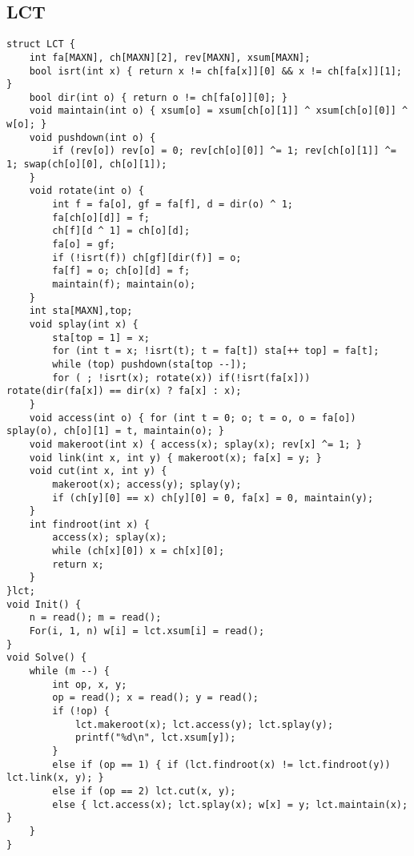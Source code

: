 \documentclass[twocolumn,a4]{article}
\begin{document}
\subsection{LCT}
\begin{lstlisting}
struct LCT {
    int fa[MAXN], ch[MAXN][2], rev[MAXN], xsum[MAXN];
    bool isrt(int x) { return x != ch[fa[x]][0] && x != ch[fa[x]][1]; }
    bool dir(int o) { return o != ch[fa[o]][0]; }
    void maintain(int o) { xsum[o] = xsum[ch[o][1]] ^ xsum[ch[o][0]] ^ w[o]; }
    void pushdown(int o) {
        if (rev[o]) rev[o] = 0; rev[ch[o][0]] ^= 1; rev[ch[o][1]] ^= 1; swap(ch[o][0], ch[o][1]);
    }
    void rotate(int o) {
        int f = fa[o], gf = fa[f], d = dir(o) ^ 1;
        fa[ch[o][d]] = f;
        ch[f][d ^ 1] = ch[o][d];
        fa[o] = gf;
        if (!isrt(f)) ch[gf][dir(f)] = o;
        fa[f] = o; ch[o][d] = f;
        maintain(f); maintain(o);
    }
    int sta[MAXN],top;
    void splay(int x) {
        sta[top = 1] = x;
        for (int t = x; !isrt(t); t = fa[t]) sta[++ top] = fa[t];
        while (top) pushdown(sta[top --]);
        for ( ; !isrt(x); rotate(x)) if(!isrt(fa[x])) rotate(dir(fa[x]) == dir(x) ? fa[x] : x);
    }
    void access(int o) { for (int t = 0; o; t = o, o = fa[o]) splay(o), ch[o][1] = t, maintain(o); }
    void makeroot(int x) { access(x); splay(x); rev[x] ^= 1; }
    void link(int x, int y) { makeroot(x); fa[x] = y; }
    void cut(int x, int y) {
        makeroot(x); access(y); splay(y);
        if (ch[y][0] == x) ch[y][0] = 0, fa[x] = 0, maintain(y);
    }
    int findroot(int x) {
        access(x); splay(x);
        while (ch[x][0]) x = ch[x][0];
        return x;
    }
}lct;
void Init() {
    n = read(); m = read();
    For(i, 1, n) w[i] = lct.xsum[i] = read();
}
void Solve() {
    while (m --) {
        int op, x, y;
        op = read(); x = read(); y = read();
        if (!op) {
            lct.makeroot(x); lct.access(y); lct.splay(y);
            printf("%d\n", lct.xsum[y]);
        }
        else if (op == 1) { if (lct.findroot(x) != lct.findroot(y)) lct.link(x, y); }
        else if (op == 2) lct.cut(x, y);
        else { lct.access(x); lct.splay(x); w[x] = y; lct.maintain(x); }
    }
}
\end{lstlisting}
\end{document}
